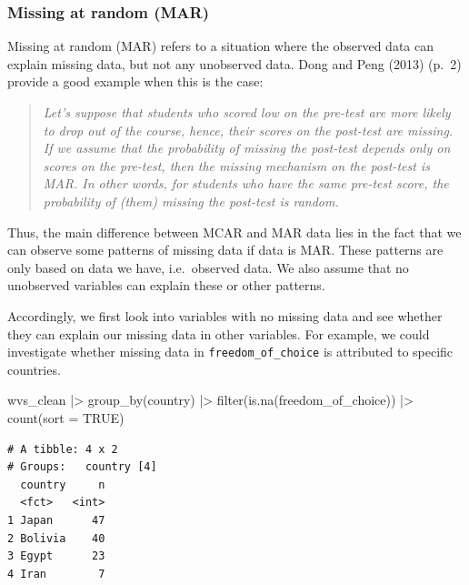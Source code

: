 \documentclass[
  letterpaper,
  DIV=11,
  numbers=noendperiod]{scrreprt}
\newenvironment{Shaded}{\begin{snugshade}}{\end{snugshade}}
\newcommand{\AttributeTok}[1]{\textcolor[rgb]{0.40,0.45,0.13}{#1}}
\newcommand{\ConstantTok}[1]{\textcolor[rgb]{0.56,0.35,0.01}{#1}}
\newcommand{\FunctionTok}[1]{\textcolor[rgb]{0.28,0.35,0.67}{#1}}
\newcommand{\NormalTok}[1]{\textcolor[rgb]{0.00,0.23,0.31}{#1}}
\newcommand{\SpecialCharTok}[1]{\textcolor[rgb]{0.37,0.37,0.37}{#1}}
\begin{document}
\subsubsection{Missing at random (MAR)}\label{sec-missing-at-random-mar}

Missing at random (MAR) refers to a situation where the observed data
can explain missing data, but not any unobserved data. Dong and Peng
(2013) (p.~2) provide a good example when this is the case:

\begin{quote}
\emph{Let's suppose that students who scored low on the pre-test are
more likely to drop out of the course, hence, their scores on the
post-test are missing. If we assume that the probability of missing the
post-test depends only on scores on the pre-test, then the missing
mechanism on the post-test is MAR. In other words, for students who have
the same pre-test score, the probability of (them) missing the post-test
is random.}
\end{quote}

Thus, the main difference between MCAR and MAR data lies in the fact
that we can observe some patterns of missing data if data is MAR. These
patterns are only based on data we have, i.e.~observed data. We also
assume that no unobserved variables can explain these or other patterns.

Accordingly, we first look into variables with no missing data and see
whether they can explain our missing data in other variables. For
example, we could investigate whether missing data in
\texttt{freedom\_of\_choice} is attributed to specific countries.

\begin{Shaded}
\begin{Highlighting}[]
\NormalTok{wvs\_clean }\SpecialCharTok{|\textgreater{}}
  \FunctionTok{group\_by}\NormalTok{(country) }\SpecialCharTok{|\textgreater{}}
  \FunctionTok{filter}\NormalTok{(}\FunctionTok{is.na}\NormalTok{(freedom\_of\_choice)) }\SpecialCharTok{|\textgreater{}}
  \FunctionTok{count}\NormalTok{(}\AttributeTok{sort =} \ConstantTok{TRUE}\NormalTok{)}
\end{Highlighting}
\end{Shaded}

\begin{verbatim}
# A tibble: 4 x 2
# Groups:   country [4]
  country     n
  <fct>   <int>
1 Japan      47
2 Bolivia    40
3 Egypt      23
4 Iran        7
\end{verbatim}
\end{document}
